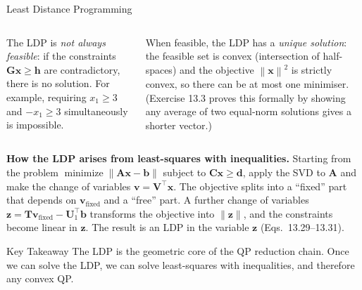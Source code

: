 \documentclass[aspectratio=169,10pt]{beamer}
\DeclareMathOperator*{\minimize}{minimize}
\newcommand{\bx}{\mathbf{x}}
\newcommand{\bb}{\mathbf{b}}
\newcommand{\bA}{\mathbf{A}}
\newcommand{\bG}{\mathbf{G}}
\newcommand{\bh}{\mathbf{h}}
\newcommand{\bC}{\mathbf{C}}
\newcommand{\bd}{\mathbf{d}}
\newcommand{\bU}{\mathbf{U}}
\newcommand{\bV}{\mathbf{V}}
\newcommand{\bT}{\mathbf{T}}
\newcommand{\norm}[1]{\left\|#1\right\|}
\begin{document}
\begin{frame}[allowframebreaks]{Least Distance Programming}
\begin{columns}[T]
      The LDP is \emph{not always feasible}: if the constraints $\bG\bx \geq \bh$
      are contradictory, there is no solution.  For example, requiring
      $x_1 \geq 3$ and $-x_1 \geq 3$ simultaneously is impossible.

      When feasible, the LDP has a \emph{unique solution}: the feasible set is convex
      (intersection of half-spaces) and the objective $\norm{\bx}^2$ is strictly
      convex, so there can be at most one minimiser.  (Exercise 13.3 proves this
      formally by showing any average of two equal-norm solutions gives a shorter vector.)
  \end{columns}

  \framebreak

  \textbf{How the LDP arises from least-squares with inequalities.}  Starting from
  the problem $\minimize\|\bA\bx - \bb\|$ subject to $\bC\bx \geq \bd$, apply the
  SVD to $\bA$ and make the change of variables $\mathbf{v} = \bV^{\top}\bx$.
  The objective splits into a ``fixed'' part that depends on $\mathbf{v}_{\text{fixed}}$
  and a ``free'' part.  A further change of variables $\mathbf{z} = \bT\mathbf{v}_{\text{fixed}} - \bU_1^{\top}\bb$
  transforms the objective into $\|\mathbf{z}\|$, and the constraints become
  linear in $\mathbf{z}$.  The result is an LDP in the variable $\mathbf{z}$
  (Eqs.~13.29--13.31).

  \begin{alertblock}{Key Takeaway}
    The LDP is the geometric core of the QP reduction chain.  Once we can solve
    the LDP, we can solve least-squares with inequalities, and therefore any
    convex QP.
  \end{alertblock}

\end{frame}
\end{document}
